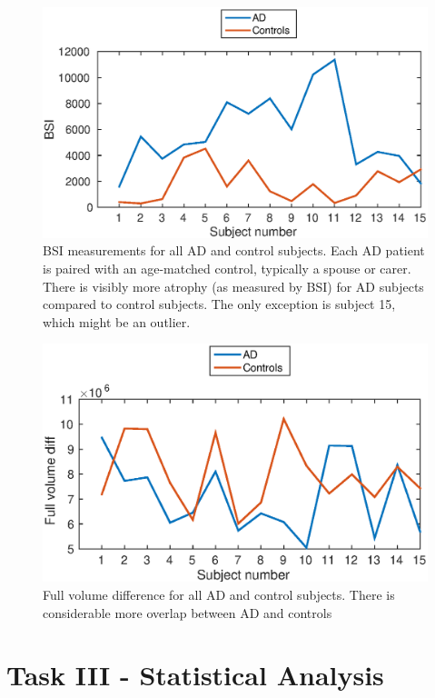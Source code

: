 \documentclass[11pt,a4paper,oneside]{report}
\begin{document}
\begin{figure}[H]
 \centering
 \includegraphics[scale=0.7]{figures/bsi_plot.eps}
 \caption{BSI measurements for all AD and control subjects. Each AD patient is paired with an age-matched control, typically a spouse or carer. \cite{malone2013miriad} There is visibly more atrophy (as measured by BSI) for AD subjects compared to control subjects. The only exception is subject 15, which might be an outlier.}
\end{figure}

\begin{figure}[H]
 \centering
 \includegraphics[scale=0.7]{figures/fullVolumePlot.eps}
 \caption{Full volume difference for all AD and control subjects. There is considerable more overlap between AD and controls }
\end{figure}



\section*{Task III - Statistical Analysis}
\end{document}
